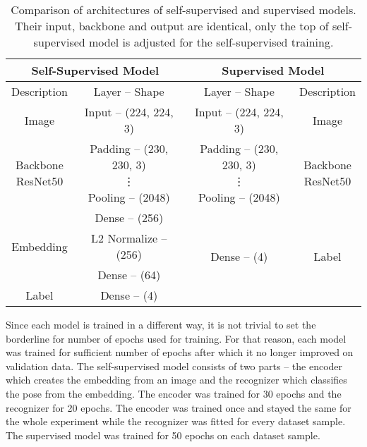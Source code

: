 \begin{table}[!ht]
    \begin{center}
        \begin{tabular}{ |c|c||c|c| }
            \hline
                \multicolumn{2}{|c||}{Self-Supervised Model} & \multicolumn{2}{c|}{Supervised Model} \\
            \hline
            \hline
            Description & Layer -- Shape & Layer -- Shape & Description \\
            \hline
            \hline
                Image & Input -- (224, 224, 3) & Input -- (224, 224, 3) & Image \\
            \hline
                \makecell{Backbone \\ ResNet50} & \makecell{Padding -- (230, 230, 3) \\ \vdots \\ Pooling -- (2048)} & \makecell{Padding -- (230, 230, 3) \\ \vdots \\ Pooling -- (2048)} & \makecell{Backbone \\ ResNet50} \\
            \hline
                & Dense -- (256) & \multirow{4}{*}{Dense -- (4)} & \multirow{4}{*}{Label} \\
            \cline{1-2}
                Embedding & L2 Normalize -- (256) & & \\
            \cline{1-2}
                & Dense -- (64) & & \\
            \cline{1-2}
                Label & Dense -- (4) & & \\
            \hline
        \end{tabular}
    \end{center}
    \caption{Comparison of architectures of self-supervised and supervised models. Their input, backbone and output are identical, only the top of self-supervised model is adjusted for the self-supervised training.}
    \label{tab:self-supervised-vs-supervised}
\end{table}

Since each model is trained in a different way, it is not trivial to set the borderline for number of epochs used for training. For that reason, each model was trained for sufficient number of epochs after which it no longer improved on validation data. The self-supervised model consists of two parts -- the encoder which creates the embedding from an image and the recognizer which classifies the pose from the embedding. The encoder was trained for 30 epochs and the recognizer for 20 epochs. The encoder was trained once and stayed the same for the whole experiment while the recognizer was fitted for every dataset sample. The supervised model was trained for 50 epochs on each dataset sample.

